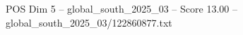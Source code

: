 \begin{textsample}{POS Dim 5 – global\_south\_2025\_03 – Score 13.00 – global\_south\_2025\_03/122860877.txt}
\end{textsample}
